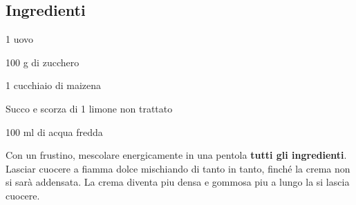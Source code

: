 \newpage
{}

\subsection*{Ingredienti}
\begin{ingredients}
	\item 1 uovo
	\item 100 g di zucchero
	\item 1 cucchiaio di maizena
	\item Succo e scorza di 1 limone non trattato
	\item 100 ml di acqua fredda
\end{ingredients}

\medskip 

Con un frustino, mescolare energicamente in una pentola \textbf{tutti gli ingredienti}.
Lasciar cuocere a fiamma dolce mischiando di tanto in tanto, finché la crema non si sarà addensata.
La crema diventa piu densa e gommosa piu a lungo la si lascia cuocere.

\vspace*{0.75 cm}

\begin{recipeblock}
	
\end{recipeblock}